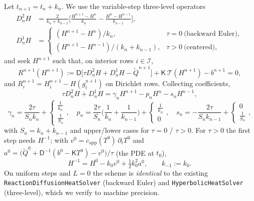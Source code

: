 \documentclass[11pt]{article}
\numberwithin{equation}{section}
\theoremstyle{remark}
\newcommand{\Dm}{\mathsf{D}}           %
\newcommand{\K}{\mathsf{K}}
\newcommand{\capp}{c_{\mathrm{app}}}
\begin{document}
Let $t_{n+1}=t_n+k_n$.  We use the variable-step three-level operators
\begin{align}
  D^2_n H &= \frac{2}{k_n+k_{n-1}}\Big[\frac{H^{n+1}-H^n}{k_n}-\frac{H^n-H^{n-1}}{k_{n-1}}\Big],\\
  D^1_n H &= \begin{cases}
    (H^{n+1}-H^n)/k_n, & \tau=0\ \text{(backward Euler)},\\
    (H^{n+1}-H^{n-1})/(k_n+k_{n-1}), & \tau>0\ \text{(centered)},
  \end{cases}
\end{align}
and seek $H^{n+1}$ such that, on interior rows $i\in\mathcal I$,
\begin{equation}
  R^{n+1}(H^{n+1}) := \Dm\big[\tau D^2_nH + D^1_nH - \tilde Q^{n+1}\big]
  + \K\,\mathcal T(H^{n+1}) - b^{n+1} = 0,
  \label{eq:residual}
\end{equation}
and $R^{n+1}_i = H^{n+1}_i - H(g_i^{n+1})$ on Dirichlet rows.  Collecting
coefficients,
\begin{equation}
  \tau D^2_nH + D^1_nH = \gamma_n H^{n+1} - p_n H^n - s_n H^{n-1},
  \label{eq:gps}
\end{equation}
\begin{equation}
  \gamma_n = \frac{2\tau}{S_nk_n}+\begin{cases}\frac1{k_n}\\[2pt] \frac1{S_n}\end{cases}\!,\quad
  p_n = \frac{2\tau}{S_n}\Big(\frac1{k_n}+\frac1{k_{n-1}}\Big)+\begin{cases}\frac1{k_n}\\[2pt]0\end{cases}\!,\quad
  s_n = -\frac{2\tau}{S_nk_{n-1}}+\begin{cases}0\\[2pt]\frac1{S_n}\end{cases}\!,
  \label{eq:coefficients}
\end{equation}
with $S_n=k_n+k_{n-1}$ and upper/lower cases for $\tau=0$ / $\tau>0$.  For
$\tau>0$ the first step needs $H^{-1}$; with $v^0=\capp(T^0)\,\partial_tT^0$ and
$a^0=\big(\tilde Q^0+\Dm^{-1}(b^0-\K T^0)-v^0\big)/\tau$ (the PDE at $t_0$),
\begin{equation}
  H^{-1} = H^0 - k_0 v^0 + \tfrac12 k_0^2 a^0,\qquad k_{-1}:=k_0 .
  \label{eq:startup}
\end{equation}
On uniform steps and $L=0$ the scheme is \emph{identical} to the existing
\texttt{ReactionDiffusionHeatSolver} (backward Euler) and
\texttt{HyperbolicHeatSolver} (three-level), which we verify to machine
precision.
\end{document}
